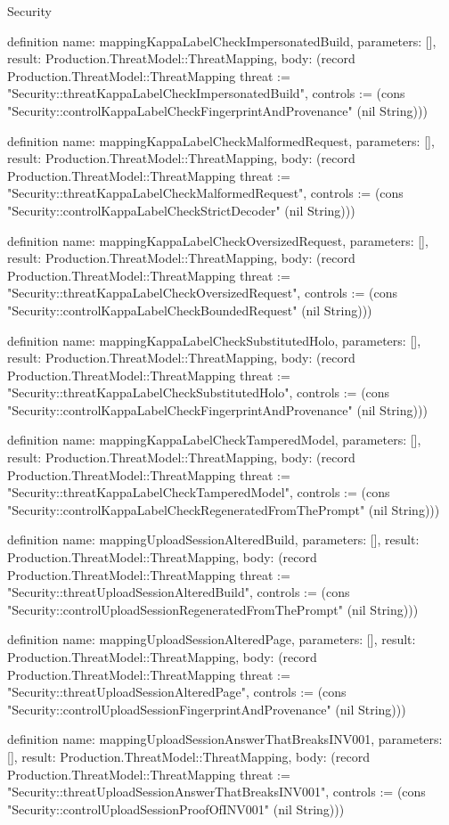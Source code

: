 \begin{lexlean}{Security}
\begin{semanticmodule}
definition{
  name: mappingKappaLabelCheckImpersonatedBuild,
  parameters: [],
  result: Production.ThreatModel::ThreatMapping,
  body: (record Production.ThreatModel::ThreatMapping {threat := "Security::threatKappaLabelCheckImpersonatedBuild", controls := (cons "Security::controlKappaLabelCheckFingerprintAndProvenance" (nil String))})
}

definition{
  name: mappingKappaLabelCheckMalformedRequest,
  parameters: [],
  result: Production.ThreatModel::ThreatMapping,
  body: (record Production.ThreatModel::ThreatMapping {threat := "Security::threatKappaLabelCheckMalformedRequest", controls := (cons "Security::controlKappaLabelCheckStrictDecoder" (nil String))})
}

definition{
  name: mappingKappaLabelCheckOversizedRequest,
  parameters: [],
  result: Production.ThreatModel::ThreatMapping,
  body: (record Production.ThreatModel::ThreatMapping {threat := "Security::threatKappaLabelCheckOversizedRequest", controls := (cons "Security::controlKappaLabelCheckBoundedRequest" (nil String))})
}

definition{
  name: mappingKappaLabelCheckSubstitutedHolo,
  parameters: [],
  result: Production.ThreatModel::ThreatMapping,
  body: (record Production.ThreatModel::ThreatMapping {threat := "Security::threatKappaLabelCheckSubstitutedHolo", controls := (cons "Security::controlKappaLabelCheckFingerprintAndProvenance" (nil String))})
}

definition{
  name: mappingKappaLabelCheckTamperedModel,
  parameters: [],
  result: Production.ThreatModel::ThreatMapping,
  body: (record Production.ThreatModel::ThreatMapping {threat := "Security::threatKappaLabelCheckTamperedModel", controls := (cons "Security::controlKappaLabelCheckRegeneratedFromThePrompt" (nil String))})
}

definition{
  name: mappingUploadSessionAlteredBuild,
  parameters: [],
  result: Production.ThreatModel::ThreatMapping,
  body: (record Production.ThreatModel::ThreatMapping {threat := "Security::threatUploadSessionAlteredBuild", controls := (cons "Security::controlUploadSessionRegeneratedFromThePrompt" (nil String))})
}

definition{
  name: mappingUploadSessionAlteredPage,
  parameters: [],
  result: Production.ThreatModel::ThreatMapping,
  body: (record Production.ThreatModel::ThreatMapping {threat := "Security::threatUploadSessionAlteredPage", controls := (cons "Security::controlUploadSessionFingerprintAndProvenance" (nil String))})
}

definition{
  name: mappingUploadSessionAnswerThatBreaksINV001,
  parameters: [],
  result: Production.ThreatModel::ThreatMapping,
  body: (record Production.ThreatModel::ThreatMapping {threat := "Security::threatUploadSessionAnswerThatBreaksINV001", controls := (cons "Security::controlUploadSessionProofOfINV001" (nil String))})
}


\end{semanticmodule}
\end{lexlean}
